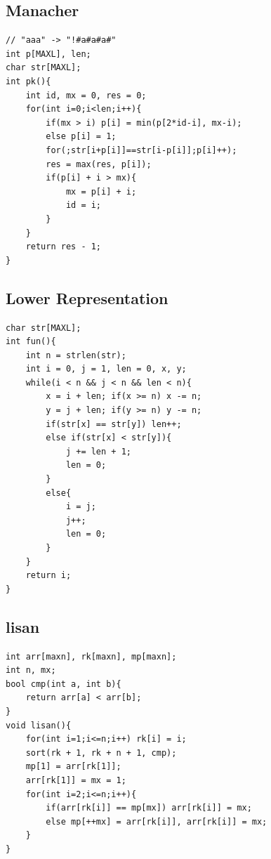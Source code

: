 \documentclass[twocolumn]{article}
\begin{document}
\begin{twocolumn}
\subsection{Manacher}
\begin{lstlisting}[language={[ANSI]C}]
// "aaa" -> "!#a#a#a#"
int p[MAXL], len;
char str[MAXL];
int pk(){
    int id, mx = 0, res = 0;
    for(int i=0;i<len;i++){
        if(mx > i) p[i] = min(p[2*id-i], mx-i);
        else p[i] = 1;
        for(;str[i+p[i]]==str[i-p[i]];p[i]++);
        res = max(res, p[i]);
        if(p[i] + i > mx){
            mx = p[i] + i;
            id = i;
        }
    }
    return res - 1;
}
\end{lstlisting}

\subsection{Lower Representation}
\begin{lstlisting}[language={[ANSI]C}]
char str[MAXL];
int fun(){
    int n = strlen(str);
    int i = 0, j = 1, len = 0, x, y;
    while(i < n && j < n && len < n){
        x = i + len; if(x >= n) x -= n;
        y = j + len; if(y >= n) y -= n;
        if(str[x] == str[y]) len++;
        else if(str[x] < str[y]){
            j += len + 1;
            len = 0;
        }
        else{
            i = j;
            j++;
            len = 0;
        }
    }
    return i;
}
\end{lstlisting}

\subsection{lisan}
\begin{lstlisting}[language={[ANSI]C}]
int arr[maxn], rk[maxn], mp[maxn];
int n, mx;
bool cmp(int a, int b){
    return arr[a] < arr[b];
}
void lisan(){
    for(int i=1;i<=n;i++) rk[i] = i;
    sort(rk + 1, rk + n + 1, cmp);
    mp[1] = arr[rk[1]];
    arr[rk[1]] = mx = 1;
    for(int i=2;i<=n;i++){
        if(arr[rk[i]] == mp[mx]) arr[rk[i]] = mx;
        else mp[++mx] = arr[rk[i]], arr[rk[i]] = mx;
    }
}
\end{lstlisting}


\end{twocolumn}
\end{document}
